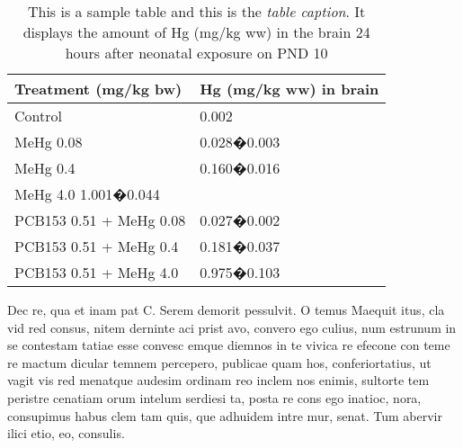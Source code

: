 \begin{table}[t]
\caption{This is a sample table and this is the \emph{table caption}. It displays the amount of Hg (mg/kg ww) in the brain 24 hours after neonatal exposure on PND 10 }
\small
\begin{tabular*}{1\textwidth}{l l}
\toprule[0,5pt]
Treatment (mg/kg bw) & Hg (mg/kg ww) in brain\\
\midrule[0,5pt]
Control & 0.002\\
MeHg 0.08 & 0.028\(�\)0.003\\
MeHg 0.4 & 0.160\(�\)0.016\\
MeHg 4.0 1.001\(�\)0.044\\
PCB153 0.51 + MeHg 0.08 & 0.027\(�\)0.002\\
PCB153 0.51 + MeHg 0.4 & 0.181\(�\)0.037\\
PCB153 0.51 + MeHg 4.0 & 0.975\(�\)0.103\\
\bottomrule[0,5pt]
\end{tabular*}
\vspace*{1pt}

\end{table}	

Dec re, qua et inam pat C. Serem demorit pessulvit. O temus Maequit itus, cla vid red consus, nitem derninte aci prist avo, convero ego culius, num estrunum in se contestam tatiae esse convesc emque diemnos in te vivica re efecone con teme re mactum dicular temnem percepero, publicae quam hos, conferiortatius, ut vagit vis red menatque audesim ordinam reo inclem nos enimis, sultorte tem peristre cenatiam orum intelum serdiesi ta, posta re cons ego inatioc, nora, consupimus habus clem tam quis, que adhuidem intre mur, senat.
Tum abervir ilici etio, eo, consulis.

